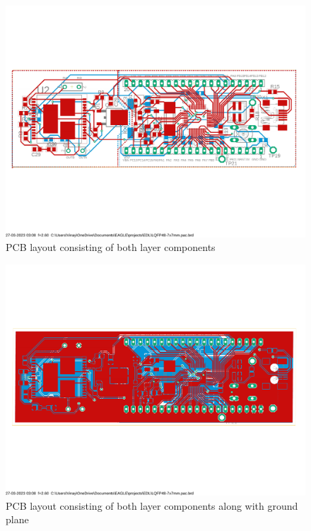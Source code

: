 \documentclass[12pt]{article}
\begin{document}
\begin{figure}[htp]
    \centering
    \includegraphics[width=\textwidth]{Images/ourpcbboth.pdf}
    \caption{PCB layout consisting of both layer components}
    \label{fig:galaxy}
\end{figure}


\begin{figure}[htp]
    \centering
    \includegraphics[width=\textwidth]{Images/ourpcbwithgplane.pdf}
    \caption{PCB layout consisting of both layer components along with ground plane}
    \label{fig:galaxy}
\end{figure}
\end{document}

